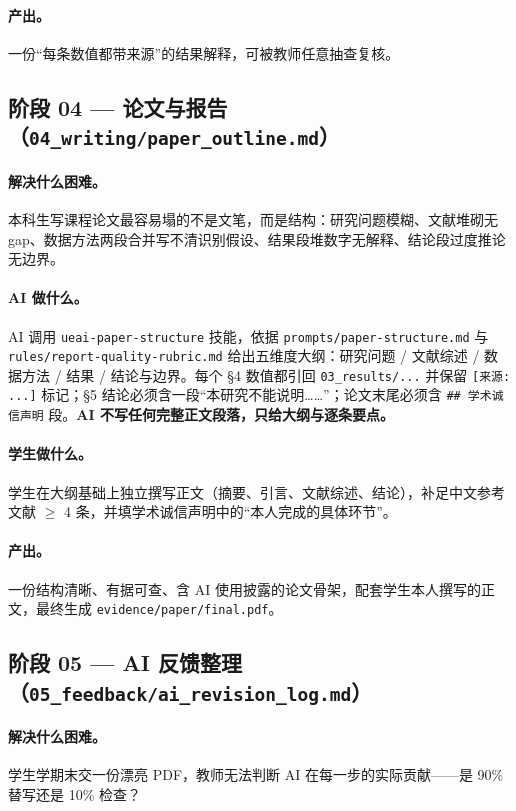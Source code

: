 \documentclass[12pt,a4paper]{article}
\begin{document}
\paragraph{产出。}一份``每条数值都带来源''的结果解释，可被教师任意抽查复核。

\subsection{阶段 04 — 论文与报告（\texttt{04\_writing/paper\_outline.md}）}

\paragraph{解决什么困难。}本科生写课程论文最容易塌的不是文笔，而是结构：研究问题模糊、文献堆砌无 gap、数据方法两段合并写不清识别假设、结果段堆数字无解释、结论段过度推论无边界。

\paragraph{AI 做什么。}AI 调用 \texttt{ueai-paper-structure} 技能，依据 \texttt{prompts/paper-structure.md} 与 \texttt{rules/report-quality-rubric.md} 给出五维度大纲：研究问题 / 文献综述 / 数据方法 / 结果 / 结论与边界。每个 §4 数值都引回 \texttt{03\_results/...} 并保留 \texttt{[来源: ...]} 标记；§5 结论必须含一段``本研究不能说明……''；论文末尾必须含 \texttt{\#\# 学术诚信声明} 段。\textbf{AI 不写任何完整正文段落，只给大纲与逐条要点。}

\paragraph{学生做什么。}学生在大纲基础上独立撰写正文（摘要、引言、文献综述、结论），补足中文参考文献 $\geq$ 4 条，并填学术诚信声明中的``本人完成的具体环节''。

\paragraph{产出。}一份结构清晰、有据可查、含 AI 使用披露的论文骨架，配套学生本人撰写的正文，最终生成 \texttt{evidence/paper/final.pdf}。

\subsection{阶段 05 — AI 反馈整理（\texttt{05\_feedback/ai\_revision\_log.md}）}

\paragraph{解决什么困难。}学生学期末交一份漂亮 PDF，教师无法判断 AI 在每一步的实际贡献——是 90\% 替写还是 10\% 检查？
\end{document}
